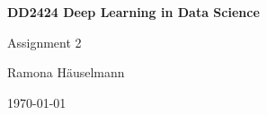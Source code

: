 \begin{titlepage}
\begin{center}
	\vspace{3em}	
    {\Huge\bfseries DD2424 Deep Learning in Data Science\par}
    \vspace{2em}
    {\huge Assignment 2 \par}
    \vspace{3em}
    {\Large Ramona Häuselmann\par}
	\vspace{1em}
    \today
\end{center}
\end{titlepage}